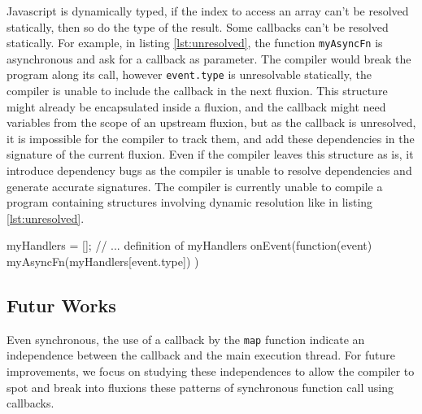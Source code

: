 

Javascript is dynamically typed, if the index to access an array can't be resolved statically, then so do the type of the result.
Some callbacks can't be resolved statically.
For example, in listing \ref{lst:unresolved}, the function \texttt{myAsyncFn} is asynchronous and ask for a callback as parameter.
The compiler would break the program along its call, however \texttt{event.type} is unresolvable statically, the compiler is unable to include the callback in the next fluxion.
This structure might already be encapsulated inside a fluxion, and the callback might need variables from the scope of an upstream fluxion, but as the callback is unresolved, it is impossible for the compiler to track them, and add these dependencies in the signature of the current fluxion.
Even if the compiler leaves this structure as is, it introduce dependency bugs as the compiler is unable to resolve dependencies and generate accurate signatures.
The compiler is currently unable to compile a program containing structures involving dynamic resolution like in listing \ref{lst:unresolved}.

\begin{code}[Javascript, caption={Example of an unresolvable callback},label={lst:unresolved}]
myHandlers = [];
// ... definition of myHandlers
onEvent(function(event) {
  myAsyncFn(myHandlers[event.type])
})
\end{code}


\subsection{Futur Works}

Even synchronous, the use of a callback by the \texttt{map} function indicate an independence between the callback and the main execution thread.
For future improvements, we focus on studying these independences to allow the compiler to spot and break into fluxions these patterns of synchronous function call using callbacks.

